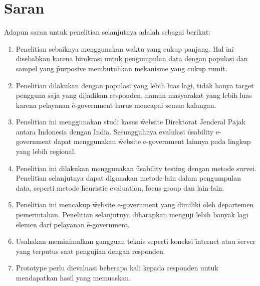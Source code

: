 \section{Saran}
Adapun saran untuk penelitian selanjutnya adalah sebagai berikut:
\begin{enumerate}
	\item Penelitian sebaiknya menggunakan waktu yang cukup panjang. Hal ini disebabkan karena birokrasi untuk pengumpulan data dengan populasi dan sampel yang \f{purposive} membutuhkan mekanisme yang cukup rumit. 
	\item Penelitian dilakukan dengan populasi yang lebih luas lagi, tidak hanya target pengguna saja yang dijadikan responden, namun masyarakat yang lebih luas karena pelayanan \f{e-government} harus mencapai semua kalangan.
	\item Penelitian ini menggunakan studi kasus \f{website} Direktorat Jenderal Pajak antara Indonesia dengan India. Sesungguhnya evalulasi \f{usability e-government} dapat menggunakan \f{website e-government} lainnya pada lingkup yang lebih regional. 
	\item Penelitian ini dilakukan menggunakan \f{usability testing} dengan metode survei. Penelitian selanjutnya dapat digunakan metode lain dalam pengumpulan data, seperti metode \f{heuristic evaluation}, \f{focus group} dan lain-lain.
	\item Penelitian ini mencakup \f{website e-government} yang dimiliki oleh departemen pemerintahan. Penelitian selanjutnya diharapkan menguji lebih banyak lagi elemen dari pelayanan \f{e-government}.
	\item Usahakan meminimalkan gangguan teknis seperti koneksi \f{internet} atau \f{server} yang terputus saat pengujian dengan responden.
	\item \f{Prototype} perlu dievaluasi beberapa kali kepada responden untuk mendapatkan hasil yang memuaskan.
\end{enumerate}
